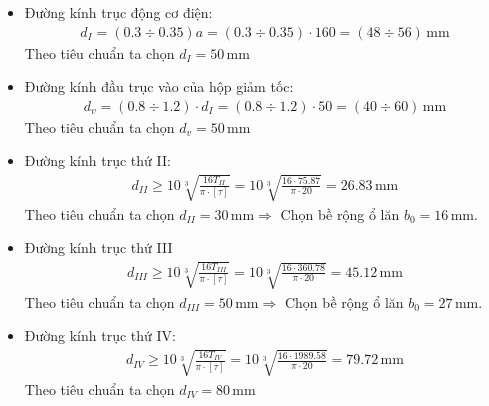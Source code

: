             \begin{itemize}
                \item Đường kính trục động cơ điện:
                    \begin{align*}
                        d_{I} = (0.3 \div 0.35)a = (0.3 \div 0.35) \cdot 160 = (48 \div 56) \, \mathrm{mm}
                    \end{align*}
                    Theo tiêu chuẩn ta chọn $d_{I} = 50 \, \mathrm{mm}$
                \item Đường kính đầu trục vào của hộp giảm tốc:
                    \begin{align*}
                        d_{v} = (0.8 \div 1.2) \cdot d_{I} = (0.8 \div 1.2) \cdot 50 = (40 \div 60) \, \mathrm{mm}
                    \end{align*}
                    Theo tiêu chuẩn ta chọn $d_{v} = 50 \, \mathrm{mm}$
                \item Đường kính trục thứ II:
                    \begin{align*}
                        d_{II} \geq 10 \sqrt[3]{\frac{16T_{II}}{\pi \cdot [\tau]}} = 10 \sqrt[3]{\frac{16 \cdot 75.87}{\pi \cdot 20}} = 26.83 \, \mathrm{mm}
                    \end{align*}
                    Theo tiêu chuẩn ta chọn $d_{II} = 30 \, \mathrm{mm} \Rightarrow$ Chọn bề rộng ổ lăn $b_{0} = 16 \, \mathrm{mm}$.
                \item Đường kính trục thứ III
                    \begin{align*}
                        d_{III} \geq 10 \sqrt[3]{\frac{16T_{III}}{\pi \cdot [\tau]}} = 10 \sqrt[3]{\frac{16 \cdot 360.78}{\pi \cdot 20}} = 45.12 \, \mathrm{mm}
                    \end{align*}
                    Theo tiêu chuẩn ta chọn $d_{III} = 50 \, \mathrm{mm} \Rightarrow$ Chọn bề rộng ổ lăn $b_{0} = 27 \, \mathrm{mm}$.
                \item Đường kính trục thứ IV:
                    \begin{align*}
                        d_{IV} \geq 10 \sqrt[3]{\frac{16T_{IV}}{\pi \cdot [\tau]}} = 10 \sqrt[3]{\frac{16 \cdot 1989.58}{\pi \cdot 20}} = 79.72 \, \mathrm{mm}
                    \end{align*}
                    Theo tiêu chuẩn ta chọn $d_{IV} = 80 \, \mathrm{mm}$
            \end{itemize}
